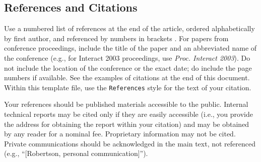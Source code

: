 \subsection{References and Citations}

Use a numbered list of references at the end of the article, ordered
                                alphabetically by first author, and referenced by numbers in brackets
                                \cite{ethics,
                                  Klemmer:2002:WSC:503376.503378,
                                  Mather:2000:MUT,
                                  Zellweger:2001:FAO:504216.504224}. For
                                papers from conference proceedings, include the title of the paper and
                                an abbreviated name of the conference (e.g., for Interact 2003
                                proceedings, use \textit{Proc. Interact 2003}). Do not include the
                                location of the conference or the exact date; do include the page
                                numbers if available. See the examples of citations at the end of this
                                document. Within this template file, use the \texttt{References} style
                                for the text of your citation.

Your references should be published materials accessible to the
                                public.  Internal technical reports may be cited only if they are
                                easily accessible (i.e., you provide the address for obtaining the
                                report within your citation) and may be obtained by any reader for a
                                nominal fee.  Proprietary information may not be cited. Private
                                communications should be acknowledged in the main text, not referenced
                                (e.g., ``[Robertson, personal communication]'').